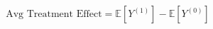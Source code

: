 \documentclass[preview]{standalone}
\begin{document}
\begin{align*}
\text{Avg Treatment Effect} = \mathbb{E}[Y^{(1)}] - \mathbb{E}[Y^{(0)}]
\end{align*}
\end{document}
